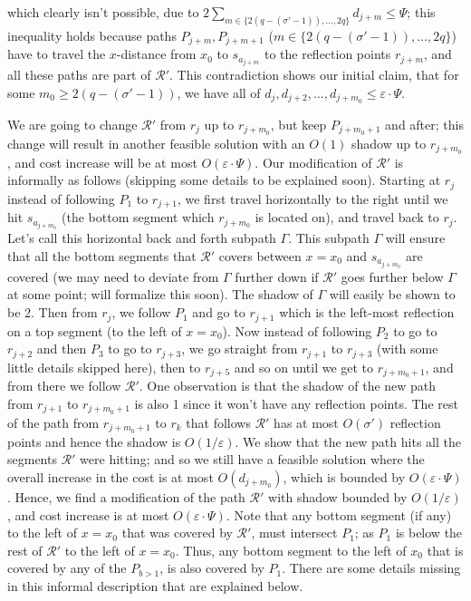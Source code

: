 \documentclass[10pt,a4paper]{amsart}
\theoremstyle{thmstyleone}
\newcommand{\eps}{\varepsilon}
\begin{document}
    which clearly isn't possible, due to $2\sum_{m\in\{2(q-(\sigma'-1)),\ldots,2q\}} d_{j+m}\leq\Psi$; this inequality holds because paths $P_{j+m},P_{j+m+1}$ ($m\in\{2(q-(\sigma'-1)),\ldots,2q\}$) have to travel the $x$-distance from $x_0$ to $s_{a_{j+m}}$ to the reflection points $r_{j+m}$, and all these paths are part of $\mathcal R'$. This contradiction shows our initial claim, that for some $m_0 \ge 2(q - (\sigma'-1))$, we have all of $d_{j},d_{j+2},\ldots,d_{j+m_0} \le \eps\cdot\Psi$.
        
        We are going to change $\mathcal R'$ from $r_{j}$ up to $r_{j + m_0}$, but keep $P_{j + m_0+1}$ and after; this change will result in another feasible solution with an $O(1)$ shadow up to $r_{j+m_0}$, and cost increase will be at most $O(\eps\cdot\Psi)$. 
        Our modification of $\mathcal R'$ is informally as follows (skipping some details to be explained soon). Starting at $r_j$ instead of following $P_1$ to $r_{j+1}$, we first travel horizontally to the right until we hit $s_{a_{j+m_0}}$ (the bottom segment which $r_{j+m_0}$ is located on), and travel back to $r_j$. Let's call this horizontal back and forth subpath $\Gamma$. 
	    This subpath $ \Gamma $ will ensure that all the bottom segments that $\mathcal R'$ covers between $x=x_0$ and $s_{a_{j+m_0}}$ are covered (we may need to deviate from $\Gamma$ further down if $\mathcal R'$ goes further below $\Gamma$ at some point; will formalize this soon). The shadow of $\Gamma$ will easily be shown to be 2.
	    Then from $r_j$, we follow $P_1$ and go to $r_{j+1}$ which is the left-most reflection on a top segment (to the left of $x=x_0$).
	    Now instead of following $P_2$ to go to $r_{j+2}$ and then $P_3$ to go to $r_{j+3}$, we go straight from $r_{j+1}$ to $r_{j+3}$ (with some little details skipped here), then to $r_{j+5}$ and so on until
	    we get to $r_{j+m_0+1}$, and from there we follow $\mathcal R'$. One observation is that the shadow of the new path from $r_{j+1}$ to $r_{j+m_0+1}$ is also 1 since it won't have any reflection points. 
	    The rest of the path from $r_{j+m_0+1}$ to $r_k$ that follows $\mathcal R'$ has at most $O(\sigma')$ reflection points and hence the shadow is $O(1/\eps)$.
	    We show that the new path hits all the segments $\mathcal R'$ were hitting; and so we still have a feasible solution where the overall increase in the cost is at most $O(d_{j+m_0})$, which is bounded by $O(\eps\cdot\Psi)$. Hence, we
	    find a modification of the path $\mathcal R'$ with shadow bounded by $O(1/\eps)$, and cost increase is at most $O(\eps\cdot\Psi)$.
		Note that any bottom segment (if any) to the left of $x=x_0$ that was covered by $\mathcal R'$, must intersect $P_1$;
        as $P_1$ is below the rest of $\mathcal R'$ to the left of $x=x_0$. 
        Thus, any bottom segment to the left of $x_0$ that is covered by any of the $P_{b>1}$, is also covered by $P_1$. There are some details missing in this informal description that are explained below.
	    
\end{document}
